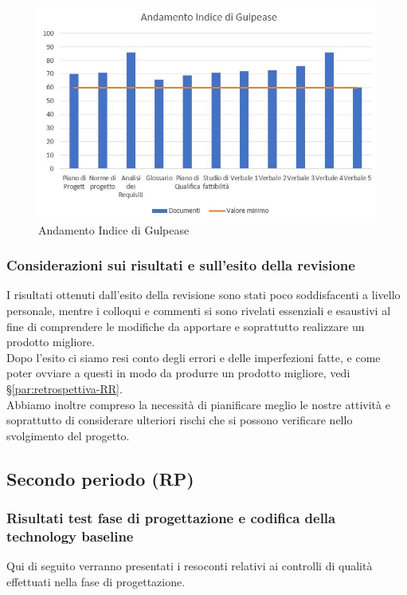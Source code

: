 \documentclass[../piano_di_qualifica.tex]{subfiles}
\begin{document}
\begin{figure}[H]
	\centering
	\includegraphics[width=12cm]{src/img/media_gul.jpg}
	\caption{ Andamento Indice di Gulpease}
\end{figure}

\subsubsection{Considerazioni sui risultati e sull’esito della revisione }
I risultati ottenuti dall’esito della revisione sono stati poco soddisfacenti a livello personale, mentre i colloqui e commenti si sono rivelati essenziali e esaustivi al fine di comprendere le modifiche da apportare e soprattutto realizzare un prodotto migliore. \\
Dopo l'esito ci siamo resi conto degli errori e delle imperfezioni fatte, e come poter ovviare a questi in modo da produrre un prodotto migliore, vedi \S\ref{par:retrospettiva-RR}. \\
Abbiamo inoltre compreso la necessità di pianificare meglio le nostre attività e soprattutto di considerare ulteriori rischi che si possono verificare nello svolgimento del progetto.


\subsection{Secondo periodo (RP)}
\label{sub:periodo-RP}
\subsubsection{Risultati test fase di progettazione e codifica della technology baseline}
Qui di seguito verranno presentati i resoconti relativi ai controlli di qualità effettuati nella fase di progettazione. \par
\end{document}
